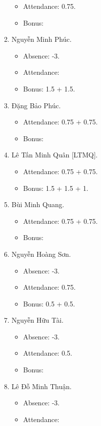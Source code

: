 \documentclass{article}
\begin{document}
\begin{enumerate}
\begin{itemize}
        \item Attendance: 0.75.
        \item Bonus:
    \end{itemize}
    \item {\sc Nguyễn Minh Phúc.}
    \begin{itemize}
        \item Absence: -3.
        \item Attendance:
        \item Bonus: 1.5 + 1.5.
    \end{itemize}
    \item {\sc Đặng Bảo Phúc.}
    \begin{itemize}
        \item Attendance: 0.75 + 0.75.
        \item Bonus:
    \end{itemize}
    \item {\sc Lê Tấn Minh Quân [LTMQ].}
    \begin{itemize}
        \item Attendance: 0.75 + 0.75.
        \item Bonus: 1.5 + 1.5 + 1.
    \end{itemize}
    \item {\sc Bùi Minh Quang.}
    \begin{itemize}
        \item Attendance: 0.75 + 0.75.
        \item Bonus:
    \end{itemize}
    \item {\sc Nguyễn Hoàng Sơn.}
    \begin{itemize}
        \item Absence: -3.
        \item Attendance: 0.75.
        \item Bonus: 0.5 + 0.5.
    \end{itemize}
    \item {\sc Nguyễn Hữu Tài.}
    \begin{itemize}
        \item Absence: -3.
        \item Attendance: 0.5.
        \item Bonus:
    \end{itemize}
    \item {\sc Lê Đỗ Minh Thuận.}
    \begin{itemize}
        \item Absence: -3.
        \item Attendance:

\end{itemize}
\end{enumerate}
\end{document}
